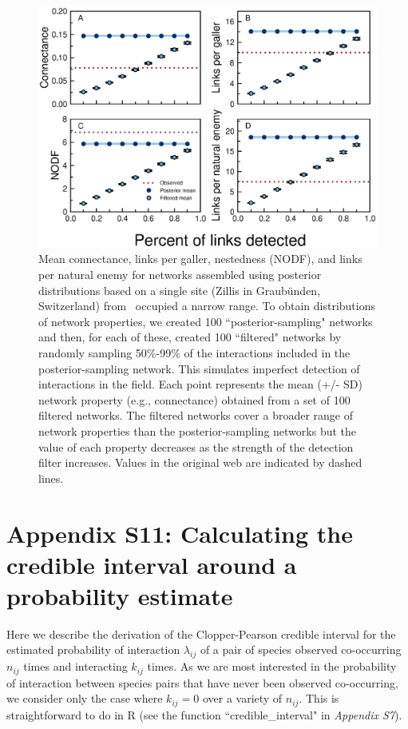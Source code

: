 \documentclass[12pt]{article}
\begin{document}
  \begin{figure}[h!]
    \caption{Mean connectance, links per galler, nestedness (NODF), and links per natural enemy for networks assembled using posterior distributions based on a single site (Zillis in Graub\"{u}nden, Switzerland) from~\citet{Kopelke2017} occupied a narrow range. To obtain distributions of network properties, we created 100 ``posterior-sampling" networks and then, for each of these, created 100 ``filtered" networks by randomly sampling 50\%-99\% of the interactions included in the posterior-sampling network. This simulates imperfect detection of interactions in the field. Each point represents the mean (+/- SD) network property (e.g., connectance) obtained from a set of 100 filtered networks. The filtered networks cover a broader range of network properties than the posterior-sampling networks but the value of each property decreases as the strength of the detection filter increases. Values in the original web are indicated by dashed lines.}
    \label{posterior_webs}    
    \begin{center}
    \includegraphics[width=.8\textwidth]{figures/GP_posterior_properties_Zillis.eps}
    \end{center}
    \end{figure}



\clearpage
\newpage

\section*{Appendix S11: Calculating the credible interval around a probability estimate}

  Here we describe the derivation of the Clopper-Pearson credible interval for the estimated probability of interaction $\lambda_{ij}$ of a pair of species observed co-occurring $n_{ij}$ times and interacting $k_{ij}$ times. As we are most interested in the probability of interaction between species pairs that have never been observed co-occurring, we consider only the case where $k_{ij}=0$ over a variety of $n_{ij}$. This is straightforward to do in R (see the function ``credible\_interval" in \emph{Appendix S7}). 
\end{document}
